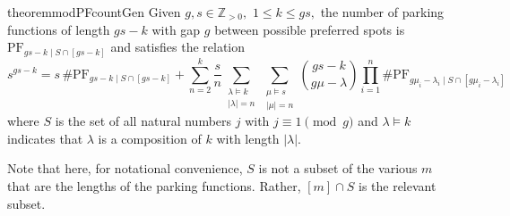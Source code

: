 \documentclass[12 pt]{amsart}
\theoremstyle{definition} %
\theoremstyle{remark} %
\begin{document}
\begin{restatable}{theorem}{modPFcountGen}
	Given $g,s\in\mathbb{Z}_{>0},$ $1\le k\le gs,$ the number of parking functions of length $gs - k$ with gap $g$ between possible preferred spots is $\mathrm{PF}_{gs - k \mid S \cap [gs - k]}$ and satisfies the relation
	\[
		s^{gs - k} = s \, \# \mathrm{PF}_{gs - k \mid S \cap [gs - k]} + \sum_{n = 2}^{k} \frac{s}{n} \sum_{\substack{\lambda \vDash k \\ \lvert\lambda\rvert = n}} \sum_{\substack{\mu \vDash s \\\lvert \mu \rvert = n}} \binom{gs - k}{g \mu - \lambda} \prod_{i = 1}^{n} \# \mathrm{PF}_{g \mu_{i} - \lambda_{i} \mid S \cap [g \mu_{i} - \lambda_{i}]}
	\]
	where $S$ is the set of all natural numbers $j$ with $j \equiv 1 \pmod g$ and $\lambda \vDash k$ indicates that $\lambda$ is a composition of $k$ with length $|\lambda|.$
\end{restatable}

Note that here, for notational convenience, $S$ is not a subset of the various $m$ that are the lengths of the parking functions. Rather, $[m] \cap S$ is the relevant subset. 
\end{document}

